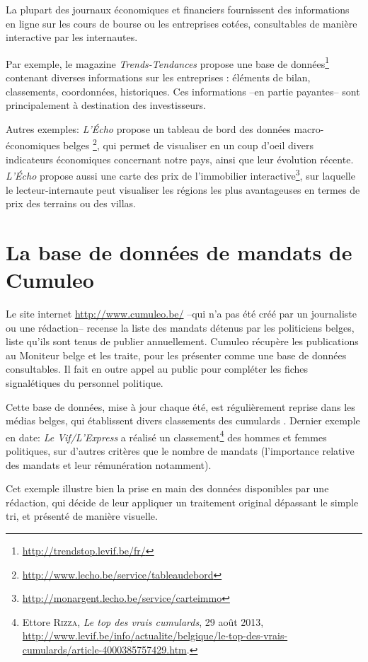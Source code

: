 La plupart des journaux économiques et financiers fournissent des informations en ligne 
sur les cours de bourse ou les entreprises cotées, consultables de manière interactive par les internautes.

Par exemple, le magazine \textit{Trends-Tendances} propose une base de données\footnote{\url{http://trendstop.levif.be/fr/}} contenant diverses informations sur les entreprises : éléments de bilan, classements, coordonnées, historiques. Ces informations --en partie payantes-- sont principalement à destination des investisseurs. 

Autres exemples: \textit{L'Écho} propose un \og tableau de bord des données macro-économiques belges \fg\footnote{\url{http://www.lecho.be/service/tableaudebord}}, qui permet de visualiser en un coup d'oeil divers indicateurs économiques concernant notre pays, ainsi que leur évolution récente. \textit{L'Écho} propose aussi une carte des prix de l'immobilier interactive\footnote{\url{http://monargent.lecho.be/service/carteimmo}}, sur laquelle le lecteur-internaute peut visualiser les régions les plus avantageuses en termes de prix des terrains ou des villas.

\section{La base de données de mandats de Cumuleo}

Le site internet \url{http://www.cumuleo.be/} --qui n'a pas été créé par un journaliste 
ou une rédaction-- 
recense la liste des mandats détenus par 
les politiciens belges, liste qu'ils sont tenus de publier annuellement. Cumuleo 
récupère les publications au Moniteur belge et les traite, pour les présenter comme une  
base de données consultables. Il fait en outre appel au public pour compléter les fiches 
signalétiques du personnel politique. 

Cette base de données, mise à jour chaque été, est régulièrement reprise dans les médias 
belges, qui établissent divers classements des \og cumulards \fg. Dernier exemple en 
date: \textit{Le Vif/L'Express} a réalisé un classement\footnote{Ettore \textsc{Rizza}, \textit{Le top des vrais cumulards}, 29 août 2013, \\ \url{http://www.levif.be/info/actualite/belgique/le-top-des-vrais-cumulards/article-4000385757429.htm}.} des hommes et femmes politiques,
sur d'autres critères que le nombre de mandats (l'importance relative des mandats et 
leur rémunération notamment).

Cet exemple illustre bien la prise en main des données disponibles par une rédaction, 
qui décide de leur appliquer un traitement original dépassant le simple tri, et présenté de manière visuelle.
